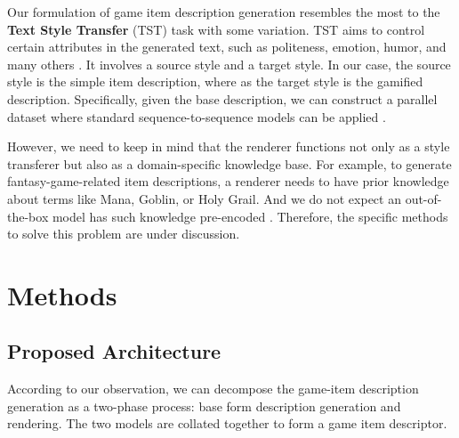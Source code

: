 \documentclass[12pt]{article}
\begin{document}
  Our formulation of game item description generation resembles the most to the \textbf{Text Style Transfer} (TST) 
    task with some variation. 
    TST aims to control certain attributes in the generated text, such as politeness, emotion, humor, 
    and many others \cite{tst_survey}. It involves a source style and a target style. In our case, the source 
    style is the simple item description, where as the target style is the gamified description. Specifically, 
    given the base description, we can construct a parallel dataset where standard sequence-to-sequence models 
    can be applied \cite{s2s_style}.

    However, we need to keep in mind that the renderer functions not only as a style transferer but also as a 
      domain-specific knowledge base. For example, to generate fantasy-game-related item descriptions, a renderer 
      needs to have prior knowledge about terms like Mana, Goblin, or Holy Grail. And we do not expect an out-of-the-box 
      model has such knowledge pre-encoded \cite{domain_adaptation}. Therefore, the specific methods to solve this problem are under discussion.

\section{Methods}
  \subsection{Proposed Architecture}
    According to our observation, we can decompose the game-item description 
      generation as a two-phase process: base form description generation and rendering.
      The two models are collated together to form a game item descriptor.
\end{document}
